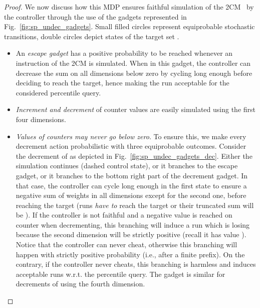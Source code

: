 \documentclass{llncs}
\begin{document}
\begin{proof}
We now discuss how this MDP  ensures faithful simulation of the 2CM~ by the controller through the use of the gadgets represented in Fig.~\ref{fig:sp_undec_gadgets}. Small filled circles represent equiprobable stochastic transitions, double circles depict states of the target set .
\begin{itemize}
\item An \textit{escape gadget} has a positive probability to be reached whenever an instruction of the 2CM is simulated. When in this gadget, the controller can decrease the sum on all dimensions below zero by cycling long enough before deciding to reach the target, hence making the run acceptable for the considered percentile query.

\item \textit{Increment and decrement} of counter values are easily simulated using the first four dimensions.

\item \textit{Values of counters may never go below zero}. To ensure this, we make every decrement action probabilistic with three equiprobable outcomes. Consider the decrement of  as depicted in Fig.~\ref{fig:sp_undec_gadgets_dec}. Either the simulation continues (dashed control state), or it branches to the escape gadget, or it branches to the bottom right part of the decrement gadget. In that case, the controller can cycle long enough in the first state to ensure a negative sum of weights in all dimensions except for the second one, before reaching the target (runs \textit{have to} reach the target or their truncated sum will be ). If the controller is not faithful and a negative value is reached on counter  when decrementing, this branching will induce a run which is losing because the second dimension will be strictly positive (recall it has value ). Notice that the controller can never cheat, otherwise this branching will happen with strictly positive probability (i.e., after a finite prefix). On the contrary, if the controller never cheats, this branching is harmless and induces acceptable runs w.r.t. the percentile query. The gadget is similar for decrements of  using the fourth dimension.


\end{itemize}
\end{proof}
\end{document}
